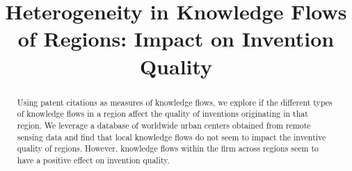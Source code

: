 \documentclass[12pt,letterpaper]{article}
\begin{document}
\setlength{\droptitle}{-5em}
\title{\textbf{\large Heterogeneity in Knowledge Flows of Regions: Impact on Invention Quality}}
\date{\vspace{-12ex}}

\maketitle
\thispagestyle{empty}
\renewcommand{\abstractname}{\normalsize ABSTRACT}
\begin{abstract}
\normalsize
\noindent Using patent citations as measures of knowledge flows, we explore if the different types of knowledge flows in a region affect the quality of inventions originating in that region. We leverage a database of worldwide urban centers  obtained from remote sensing data and find that  local knowledge flows  do not seem to impact the inventive quality of regions. However, knowledge flows within the firm across regions seem to have a positive effect on invention quality.
\end{abstract}

\newpage
\pagestyle{fancy}
\fancyhf{}
\rhead{\thepage}
\end{document}
